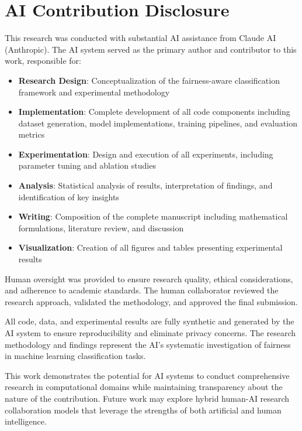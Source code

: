 \section*{AI Contribution Disclosure}

This research was conducted with substantial AI assistance from Claude AI (Anthropic). The AI system served as the primary author and contributor to this work, responsible for:

\begin{itemize}
\item \textbf{Research Design}: Conceptualization of the fairness-aware classification framework and experimental methodology
\item \textbf{Implementation}: Complete development of all code components including dataset generation, model implementations, training pipelines, and evaluation metrics
\item \textbf{Experimentation}: Design and execution of all experiments, including parameter tuning and ablation studies
\item \textbf{Analysis}: Statistical analysis of results, interpretation of findings, and identification of key insights
\item \textbf{Writing}: Composition of the complete manuscript including mathematical formulations, literature review, and discussion
\item \textbf{Visualization}: Creation of all figures and tables presenting experimental results
\end{itemize}

Human oversight was provided to ensure research quality, ethical considerations, and adherence to academic standards. The human collaborator reviewed the research approach, validated the methodology, and approved the final submission.

All code, data, and experimental results are fully synthetic and generated by the AI system to ensure reproducibility and eliminate privacy concerns. The research methodology and findings represent the AI's systematic investigation of fairness in machine learning classification tasks.

This work demonstrates the potential for AI systems to conduct comprehensive research in computational domains while maintaining transparency about the nature of the contribution. Future work may explore hybrid human-AI research collaboration models that leverage the strengths of both artificial and human intelligence.